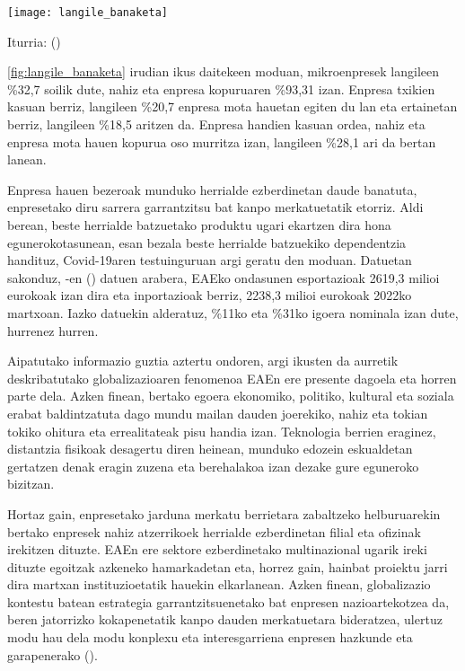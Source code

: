 \begin{center}
    \label{fig:langile_banaketa}
    \centering
    \texttt{[image: langile\_banaketa]}
    \par{Iturria: \citeauthor{confebask2014dimension} (\citeyear{confebask2014dimension})}
\end{center}

\ref{fig:langile_banaketa} irudian ikus daitekeen moduan, mikroenpresek langileen \%32,7 soilik dute, nahiz eta enpresa kopuruaren \%93,31 izan. Enpresa txikien kasuan berriz, langileen \%20,7 enpresa mota hauetan egiten du lan eta ertainetan berriz, langileen \%18,5 aritzen da. Enpresa handien kasuan ordea, nahiz eta enpresa mota hauen kopurua oso murritza izan, langileen \%28,1 ari da bertan lanean.

Enpresa hauen bezeroak munduko herrialde ezberdinetan daude banatuta, enpresetako diru sarrera garrantzitsu bat kanpo merkatuetatik etorriz. Aldi berean, beste herrialde batzuetako produktu ugari ekartzen dira hona egunerokotasunean, esan bezala beste herrialde batzuekiko dependentzia handituz, Covid-19aren testuinguruan argi geratu den moduan. Datuetan sakonduz, \citeauthor{eustat2022kanpo}-en (\citeyear{eustat2022kanpo}) datuen arabera, EAEko ondasunen esportazioak 2619,3 milioi eurokoak izan dira eta inportazioak berriz, 2238,3 milioi eurokoak 2022ko martxoan. Iazko datuekin alderatuz, \%11ko eta \%31ko igoera nominala izan dute, hurrenez hurren.

Aipatutako informazio guztia aztertu ondoren, argi ikusten da aurretik deskribatutako globalizazioaren fenomenoa EAEn ere presente dagoela eta horren parte dela. Azken finean, bertako egoera ekonomiko, politiko, kultural eta soziala erabat baldintzatuta dago mundu mailan dauden joerekiko, nahiz eta tokian tokiko ohitura eta errealitateak pisu handia izan. Teknologia berrien eraginez, distantzia fisikoak desagertu diren heinean, munduko edozein eskualdetan gertatzen denak eragin zuzena eta berehalakoa izan dezake gure eguneroko bizitzan.

Hortaz gain, enpresetako jarduna merkatu berrietara zabaltzeko helburuarekin bertako enpresek nahiz atzerrikoek herrialde ezberdinetan filial eta ofizinak irekitzen dituzte. EAEn ere sektore ezberdinetako multinazional ugarik ireki dituzte egoitzak azkeneko hamarkadetan eta, horrez gain, hainbat proiektu jarri dira martxan instituzioetatik hauekin elkarlanean. Azken finean, globalizazio kontestu batean estrategia garrantzitsuenetako bat enpresen nazioartekotzea da, beren jatorrizko kokapenetatik kanpo dauden merkatuetara bideratzea, ulertuz modu hau dela modu konplexu eta interesgarriena enpresen hazkunde eta garapenerako (\cite{larrinaga2005internacionalizacion}).

